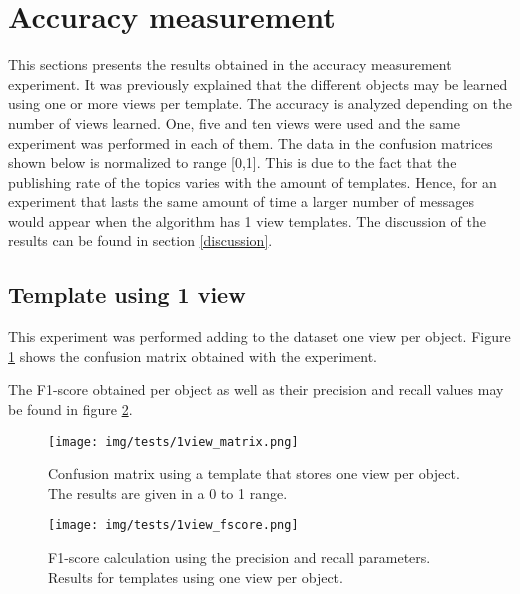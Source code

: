 \section{Accuracy measurement}
\label{results_accuracy_measurement}
This sections presents the results obtained in the accuracy measurement experiment. 
It was previously explained that the different objects may be learned using one or more views per template. 
The accuracy is analyzed depending on the number of views learned. 
One, five and ten views were used and the same experiment was performed in each of them. 
The data in the confusion matrices shown below is normalized to range [0,1].
This is due to the fact that the publishing rate of the topics varies with the amount of templates. 
Hence, for an experiment that lasts the same amount of time a larger number of messages would appear when the algorithm has 1 view templates. 
The discussion of the results can be found in section \ref{discussion}.

\subsection{Template using 1 view}
This experiment was performed adding to the dataset one view per object. 
Figure \ref{1view_matrix} shows the confusion matrix obtained with the experiment. 

The F1-score obtained per object as well as their precision and recall values may be found in figure \ref{1view_fscore}.

	\begin{figure}[H]
		\begin{center}
	    \texttt{[image: img/tests/1view\_matrix.png]}
		\caption[Confusion matrix - templates using 1 view]{Confusion matrix using a template that stores one view per object. The results are given in a 0 to 1 range. }
		\label{1view_matrix}
		\end{center}
	\end{figure}

	\begin{figure}[H]
		\begin{center}
		\texttt{[image: img/tests/1view\_fscore.png]}
		\caption[F1-score - templates using 1 view]{F1-score calculation using the precision and recall parameters. Results for templates using one view per object. }
		\label{1view_fscore}
		\end{center}
	\end{figure}




